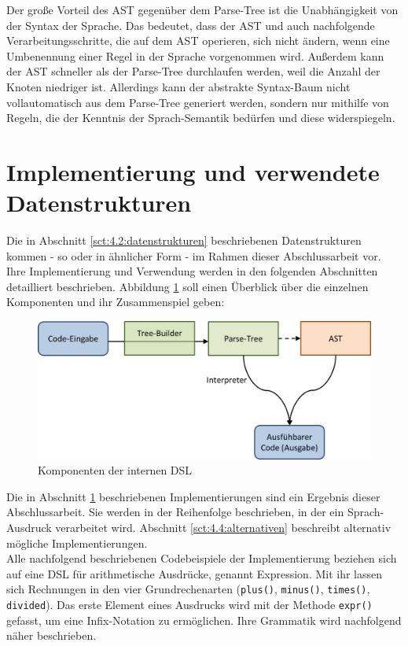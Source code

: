 Der große Vorteil des AST gegenüber dem Parse-Tree ist die Unabhängigkeit von der Syntax der Sprache. Das bedeutet, dass der AST und auch  nachfolgende Verarbeitungsschritte, die auf dem AST operieren, sich nicht ändern, wenn eine Umbenennung einer Regel in der Sprache vorgenommen wird. Außerdem kann der AST schneller als der Parse-Tree durchlaufen werden, weil die Anzahl der Knoten niedriger ist. Allerdings kann der abstrakte Syntax-Baum nicht vollautomatisch aus dem Parse-Tree generiert werden, sondern nur mithilfe von Regeln, die der Kenntnis der Sprach-Semantik bedürfen und diese widerspiegeln.

\section{Implementierung und verwendete Datenstrukturen}\label{sct:4.3:implementierung}
Die in Abschnitt \ref{sct:4.2:datenstrukturen} beschriebenen Datenstrukturen kommen - so oder in ähnlicher Form - im Rahmen dieser Abschlussarbeit vor. Ihre Implementierung und Verwendung werden in den folgenden Abschnitten detailliert beschrieben. Abbildung \ref{fig:komponenten} soll einen Überblick über die einzelnen Komponenten und ihr Zusammenspiel geben:

\begin{figure}[H]
\centering\includegraphics[width=.8\textwidth]{images/kapitel4/komponenten.png}
\caption{Komponenten der internen DSL}
\label{fig:komponenten}
\end{figure}

Die in Abschnitt \ref{sct:4.3:implementierung} beschriebenen Implementierungen sind ein Ergebnis dieser Abschlussarbeit. Sie werden in der Reihenfolge beschrieben, in der ein Sprach-Ausdruck verarbeitet wird. Abschnitt \ref{sct:4.4:alternativen} beschreibt alternativ mögliche Implementierungen.\\
Alle nachfolgend beschriebenen Codebeispiele der Implementierung beziehen sich auf eine DSL für arithmetische Ausdrücke, genannt \glqq Expression\grqq. Mit ihr lassen sich Rechnungen in den vier Grundrechenarten (\texttt{plus()}, \texttt{minus()}, \texttt{times()}, \texttt{divided}). Das erste Element eines Ausdrucks wird mit der Methode \texttt{expr()} gefasst, um eine Infix-Notation zu ermöglichen. Ihre Grammatik wird nachfolgend näher beschrieben.

